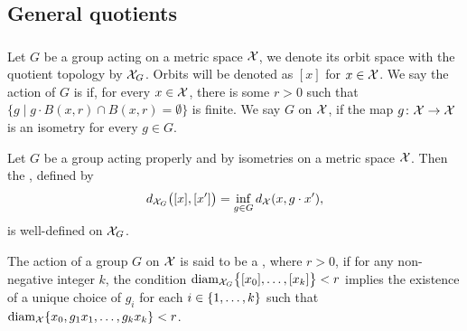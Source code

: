 
\subsection{General quotients}

\subsubsection{}


Let $G$ be a group acting on a metric space $\cX$, we denote its orbit space with the quotient topology by $\cX_G$.
Orbits will be denoted as $[x]$ for $x \in \cX$.
We say the action of $G$ is  if, for every $x \in \cX$, there is some $r>0$ such that $\{g \mid g\cdot B(x,r) \cap B(x,r) = \emptyset\}$ is finite.
We say $G$  on $\cX$, if the map $g \colon \cX \to \cX$ is an isometry for every $g \in G$.

Let $G$ be a group acting properly and by isometries on a metric space $\cX$.
Then the , defined by
\[
d_{\cX_G}\big([x], [x']\big) = \inf_{g \in G} d_\cX(x, g \cdot x'),
\]
is well-defined on $\cX_G$.

The action of a group $G$ on $\cX$ is said to be a , where $r > 0$, if for any non-negative integer $k$, the condition $\diam_{\cX_G}\set[\big]{[x_0],\dots,[x_k]} < r$ implies the existence of a unique choice of $g_i$ for each $i \in \set{1,\dots,k}$ such that $\diam_{\cX}\set{x_0, g_1x_1, \dots, g_kx_k} < r$.


\subsubsection{}\label{subsub:h}

